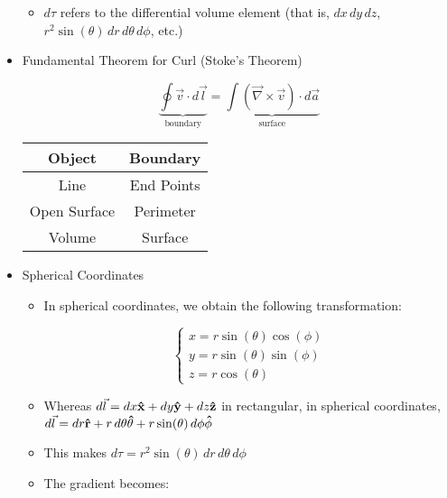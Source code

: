 \begin{itemize}
    \begin{itemize}

      \item $d\tau$ refers to the differential volume element (that is, $dx\,dy\,dz$, $r^2\sin(\theta)\,dr\,d\theta\,d\phi$, etc.)

    \end{itemize}

  \item Fundamental Theorem for Curl (Stoke's Theorem)

    $$\underbrace{\oint\vec{v}\cdot d\vec{l}}_{\text{boundary}}=\underbrace{\int(\vec{\nabla}\times\vec{v})\cdot d\vec{a}}_{\text{surface}}$$

    \begin{center}
      \begin{tabular}[h]{|c|c|}
        \hline
        Object & Boundary\\
        \hline
        Line & End Points\\
        \hline
        Open Surface & Perimeter\\
        \hline
        Volume & Surface\\
        \hline
      \end{tabular}
    \end{center}

  \item Spherical Coordinates

    \begin{itemize}

      \item In spherical coordinates, we obtain the following transformation:

        $$\left\{\begin{array}{l}x=r\sin(\theta)\cos(\phi)\\y=r\sin(\theta)\sin(\phi)\\z=r\cos(\theta)\end{array}$$

        \item Whereas $d\vec{l}=dx\bold{\hat{x}}+dy\bold{\hat{y}}+dz\bold{\hat{z}}$ in rectangular, in spherical coordinates, $d\vec{l}=dr\bold{\hat{r}}+r\,d\theta\bold{\hat{\theta}}+r\sin(\theta)\,d\phi\bold{\hat{\phi}}$

        \item This makes $d\tau=r^2\sin(\theta)\,dr\,d\theta\,d\phi$

        \item The gradient becomes:


\end{itemize}
\end{itemize}
